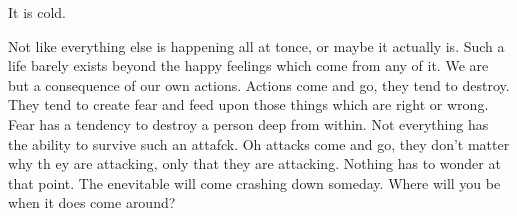It is cold.

Not like everything else is happening all at tonce, or maybe it actually is.
Such a life barely exists beyond the happy feelings which come from any of it.
We are but a consequence of our own actions. Actions come and go, they tend to
destroy. They tend to create fear and feed upon those things which are right or
wrong. Fear has a tendency to destroy a person deep from within. Not everything
has the ability to survive such an attafck. Oh attacks come and go, they don't
matter why th ey are attacking, only that they are attacking. Nothing has to
wonder at that point. The enevitable will come crashing down someday. Where will
you be when it does come around?